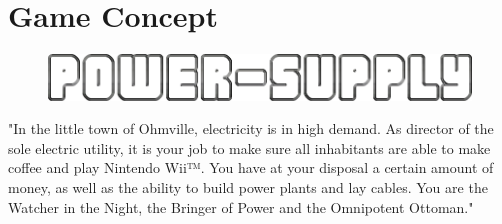 \chapter{Game Concept}

	\begin{figure}[H]
    	\includegraphics[scale=0.40]{pictures/logo2.png}
    \end{figure}

	"In the little town of Ohmville, electricity is in high demand. As director of the sole electric 
	utility, it is your job to make sure all inhabitants are able to make coffee and play Nintendo Wii™. 
	You have at your disposal a certain amount of money, as well as the ability to build power plants 
	and lay cables. You are the Watcher in the Night, the Bringer of Power and the Omnipotent Ottoman."

